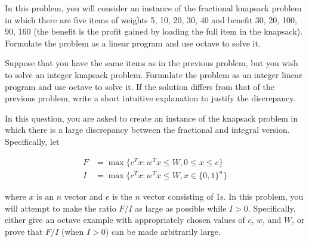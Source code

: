 \documentclass[fleqn]{homework}
\begin{document}
  \begin{problem}{4}
    \begin{question}
      In this problem, you will consider an instance of the fractional knapsack
      problem in which there are five items of weights 5, 10, 20, 30, 40 and
      benefit 30, 20, 100, 90, 160 (the benefit is the profit gained by loading
      the full item in the knapsack).  Formulate the problem as a linear program
      and use octave to solve it.
    \end{question}
  \end{problem}

  \begin{problem}{5}
    \begin{question}
      Suppose that you have the same items as in the previous problem, but you
      wish to solve an integer knapsack problem.  Formulate the problem as an
      integer linear program and use octave to solve it.  If the solution
      differs from that of the previous problem, write a short intuitive
      explanation to justify the discrepancy.
    \end{question}
  \end{problem}

  \begin{problem}{6}
    \begin{question}
      In this question, you are asked to create an instance of the knapsack
      problem in which there is a large discrepancy between the fractional and
      integral version.  Specifically, let

      \begin{align*}
        F &= \max \{c^T x: w^T x \leq W, 0 \leq x \leq e\}\\
        I &= \max \{c^T x: w^T x \leq W, x\in\{0,1\}^n\}
      \end{align*}

      where $x$ is an $n$ vector and $e$ is the $n$ vector consisting of 1s.  In
      this problem, you will attempt to make the ratio $F/I$ as large as
      possible while $I>0$.  Specifically, either give an octave example with
      appropriately chosen values of $c$, $w$, and $W$, or prove that $F/I$
      (when $I>0$) can be made arbitrarily large.
    \end{question}
  \end{problem}
\end{document}
